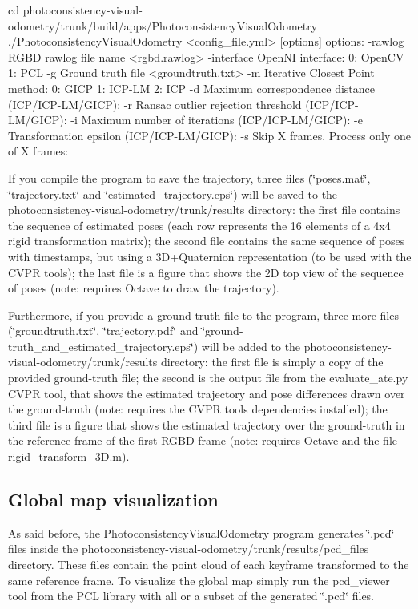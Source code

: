 \begin{DoxyVerb}
cd photoconsistency-visual-odometry/trunk/build/apps/PhotoconsistencyVisualOdometry
./PhotoconsistencyVisualOdometry <config_file.yml> [options]
       options: 
               -rawlog     RGBD rawlog file name <rgbd.rawlog>
               -interface  OpenNI interface:
                           0: OpenCV
                           1: PCL
               -g          Ground truth file <groundtruth.txt>
               -m          Iterative Closest Point method:
                           0: GICP
                           1: ICP-LM
                           2: ICP
               -d          Maximum correspondence distance (ICP/ICP-LM/GICP):
               -r          Ransac outlier rejection threshold (ICP/ICP-LM/GICP):
               -i          Maximum number of iterations (ICP/ICP-LM/GICP):
               -e          Transformation epsilon (ICP/ICP-LM/GICP):
               -s          Skip X frames. Process only one of X frames:
\end{DoxyVerb}


If you compile the program to save the trajectory, three files (\char`\"{}poses.mat\char`\"{}, \char`\"{}trajectory.txt\char`\"{} and \char`\"{}estimated\_\-trajectory.eps\char`\"{}) will be saved to the photoconsistency-\/visual-\/odometry/trunk/results directory: the first file contains the sequence of estimated poses (each row represents the 16 elements of a 4x4 rigid transformation matrix); the second file contains the same sequence of poses with timestamps, but using a 3D+Quaternion representation (to be used with the CVPR tools); the last file is a figure that shows the 2D top view of the sequence of poses (note: requires Octave to draw the trajectory).

Furthermore, if you provide a ground-\/truth file to the program, three more files (\char`\"{}groundtruth.txt\char`\"{}, \char`\"{}trajectory.pdf\char`\"{} and \char`\"{}ground-\/truth\_\-and\_\-estimated\_\-trajectory.eps\char`\"{}) will be added to the photoconsistency-\/visual-\/odometry/trunk/results directory: the first file is simply a copy of the provided ground-\/truth file; the second is the output file from the evaluate\_\-ate.py CVPR tool, that shows the estimated trajectory and pose differences drawn over the ground-\/truth (note: requires the CVPR tools dependencies installed); the third file is a figure that shows the estimated trajectory over the ground-\/truth in the reference frame of the first RGBD frame (note: requires Octave and the file rigid\_\-transform\_\-3D.m).\hypertarget{index_A}{}\subsection{Global map visualization}\label{index_A}
As said before, the PhotoconsistencyVisualOdometry program generates \char`\"{}.pcd\char`\"{} files inside the photoconsistency-\/visual-\/odometry/trunk/results/pcd\_\-files directory. These files contain the point cloud of each keyframe transformed to the same reference frame. To visualize the global map simply run the pcd\_\-viewer tool from the PCL library with all or a subset of the generated \char`\"{}.pcd\char`\"{} files.

